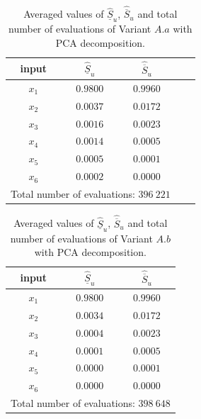 \begin{table}[!ht]
\caption{Averaged values of $\widehat{\underline{S}}_u$, ${\widehat{\overline{S}}_u}$ and total number of evaluations of Variant $A.a$ with PCA decomposition.}
\centering
\begin{tabular}{ccccc}
\hline
 input & $\widehat{\underline{S}}_u$ & $\widehat{\overline{S}}_u$ \\ \hline
 $x_1$ & $0.9800$ & $0.9960$  \\ \hline
 $x_2$ & $0.0037$ & $0.0172$  \\ \hline
 $x_3$ & $0.0016$ & $0.0023$  \\ \hline
 $x_4$ & $0.0014$ & $0.0005$  \\ \hline
 $x_5$ & $0.0005$ & $0.0001$  \\ \hline
 $x_6$ & $0.0002$ & $0.0000$ \\ \hline
 \multicolumn{3}{l}{Total number of evaluations: $396 \ 221$}
 \\ \hline
\end{tabular}
\label{res.AsianPCA.Aa}
\end{table}

\begin{table}[!ht]
\caption{Averaged values of $\widehat{\underline{S}}_u$, ${\widehat{\overline{S}}_u}$ and total number of evaluations of Variant $A.b$ with PCA decomposition.}
 \centering
\begin{tabular}{ccc}
\hline
 input & $\widehat{\underline{S}}_u$ & $\widehat{\overline{S}}_u$ \\ \hline
 $x_1$ & $0.9800$ &  $0.9960$  \\ \hline
 $x_2$ & $0.0034$ &  $0.0172$  \\ \hline
 $x_3$ & $0.0004$ &  $0.0023$  \\ \hline
 $x_4$ & $0.0001$ &  $0.0005$  \\ \hline
 $x_5$ & $0.0000$ &  $0.0001$  \\ \hline
 $x_6$ & $0.0000$ &  $0.0000$  \\ \hline \hline
\multicolumn{3}{l}{Total number of evaluations: $398 \ 648$} \\ \hline 
\end{tabular}
\label{res.AsianPCA.Ab}
\end{table}

